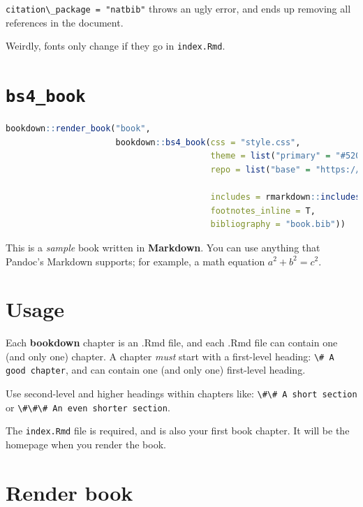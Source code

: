 \documentclass[
]{book}
\newcommand{\passthrough}[1]{#1}
\begin{document}
\passthrough{\lstinline!citation\_package = "natbib"!} throws an ugly error, and ends up removing all references in the document.

Weirdly, fonts only change if they go in \passthrough{\lstinline!index.Rmd!}.

\hypertarget{bs4_book}{%
\section{\texorpdfstring{\texttt{bs4\_book}}{bs4\_book}}\label{bs4_book}}

\begin{lstlisting}[language=R]
bookdown::render_book("book",
                      bookdown::bs4_book(css = "style.css",
                                         theme = list("primary" = "#52002E"),
                                         repo = list("base" = "https://github.com/brettellebi/PhD-thesis",
                                                                                         "branch" = "master", "subdir" = "book"),
                                         includes = rmarkdown::includes(in_header = "css.html"),
                                         footnotes_inline = T,
                                         bibliography = "book.bib"))
\end{lstlisting}

This is a \emph{sample} book written in \textbf{Markdown}. You can use anything that Pandoc's Markdown supports; for example, a math equation \(a^2 + b^2 = c^2\).

\hypertarget{usage}{%
\section{Usage}\label{usage}}

Each \textbf{bookdown} chapter is an .Rmd file, and each .Rmd file can contain one (and only one) chapter. A chapter \emph{must} start with a first-level heading: \passthrough{\lstinline!\# A good chapter!}, and can contain one (and only one) first-level heading.

Use second-level and higher headings within chapters like: \passthrough{\lstinline!\#\# A short section!} or \passthrough{\lstinline!\#\#\# An even shorter section!}.

The \passthrough{\lstinline!index.Rmd!} file is required, and is also your first book chapter. It will be the homepage when you render the book.

\hypertarget{render-book}{%
\section{Render book}\label{render-book}}
\end{document}
